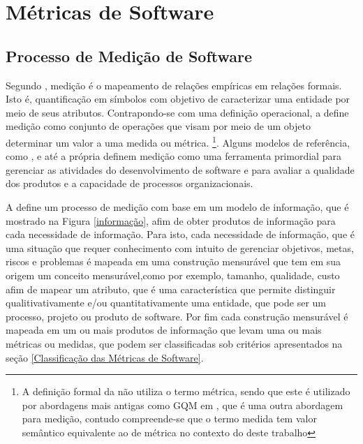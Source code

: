 \chapter{Métricas de Software}

\section{Processo de Medição de Software}

Segundo , medição é o mapeamento de relações empíricas em relações formais. Isto é, quantificação em símbolos com objetivo de caracterizar uma entidade por meio de seus atributos. Contrapondo-se com uma  definição operacional, a  define medição como conjunto de operações que visam por meio de um objeto determinar um valor a uma medida ou métrica. \footnote{A definição formal da  não utiliza o termo métrica, sendo que este é utilizado por abordagens mais antigas como GQM em , que é uma outra abordagem para medição, contudo compreende-se que o termo medida tem valor semântico equivalente ao de métrica no contexto do deste trabalho}. Alguns modelos de referência, como , e até a própria  definem medição como uma ferramenta primordial para gerenciar as atividades do desenvolvimento de software e para avaliar a qualidade dos produtos e a capacidade de processos organizacionais. 


A  define um processo de medição com base em um modelo de
informação, que é mostrado na Figura \ref{informação}, afim de obter produtos de informação para cada necessidade de informação. Para isto, cada necessidade de informação, que é uma situação que requer conhecimento com intuito de  gerenciar objetivos, metas, riscos e problemas é mapeada em uma construção  mensurável que tem em sua origem um conceito mensurável,como por exemplo,  tamanho, qualidade, custo afim de mapear um atributo, que é uma característica  que permite distinguir qualitivativamente e/ou quantitativamente uma entidade, que pode ser um processo, projeto ou produto de software. Por fim  cada construção mensurável é mapeada em um ou mais produtos de informação que  levam uma ou mais métricas ou medidas, que podem ser classificadas sob  critérios apresentados na seção \ref{Classificação das Métricas de Software}.


